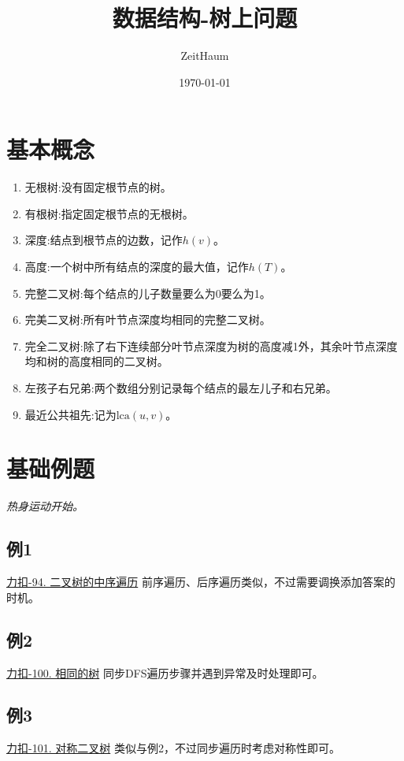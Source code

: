 \documentclass{article}
\author{ZeitHaum}
\date{\today}
\title{数据结构-树上问题}
\begin{document}
\maketitle
\newpage
\tableofcontents
\newpage
\setcounter{page}{1}
\section{基本概念}
\begin{enumerate}
    \item 无根树:没有固定根节点的树。
    \item 有根树:指定固定根节点的无根树。
    \item 深度:结点到根节点的边数，记作$h(v)$。
    \item 高度:一个树中所有结点的深度的最大值，记作$h(T)$。
    \item 完整二叉树:每个结点的儿子数量要么为0要么为1。
    \item 完美二叉树:所有叶节点深度均相同的完整二叉树。
    \item 完全二叉树:除了右下连续部分叶节点深度为树的高度减1外，其余叶节点深度均和树的高度相同的二叉树。
    \item 左孩子右兄弟:两个数组分别记录每个结点的最左儿子和右兄弟。
    \item 最近公共祖先:记为$\text{lca}(u,v)$。
\end{enumerate}

\section{基础例题}
\emph{热身运动开始。}

\subsection{例1}
\href{https://leetcode.cn/problems/binary-tree-inorder-traversal/description/}{力扣-94. 二叉树的中序遍历}
前序遍历、后序遍历类似，不过需要调换添加答案的时机。


\subsection{例2}
\href{https://leetcode.cn/problems/same-tree/}{力扣-100. 相同的树}
同步DFS遍历步骤并遇到异常及时处理即可。


\subsection{例3}
\href{https://leetcode.cn/problems/symmetric-tree/description/}{力扣-101. 对称二叉树}
类似与例2，不过同步遍历时考虑对称性即可。

\end{document}
